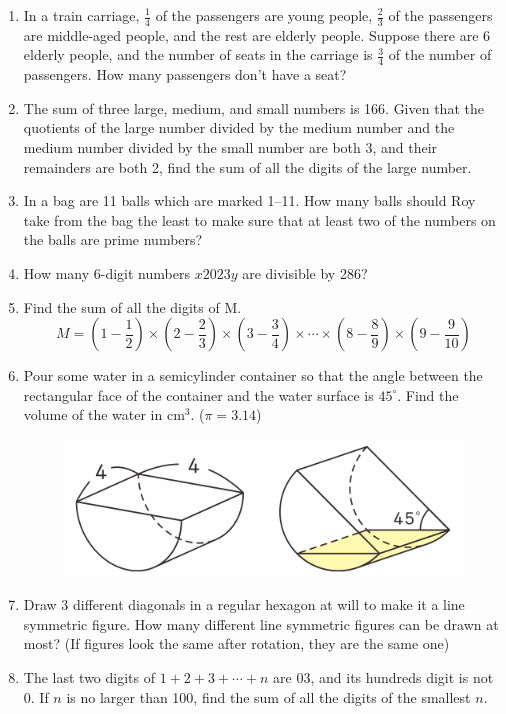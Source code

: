 \documentclass[11pt]{scrartcl}
\begin{document}
\begin{enumerate}
    \item In a train carriage, $\frac{1}{4}$ of the passengers are young people, $\frac{2}{3}$ of the passengers are middle-aged people, and the rest are elderly people. Suppose there are 6 elderly people, and the number of seats in the carriage is $\frac{3}{4}$ of the number of passengers. How many passengers don't have a seat?
    
    \item The sum of three large, medium, and small numbers is 166. Given that the quotients of the large number divided by the medium number and the medium number divided by the small number are both 3, and their remainders are both 2, find the sum of all the digits of the large number.

    
    \item In a bag are 11 balls which are marked 1--11. How many balls should Roy take from the bag the least to make sure that at least two of the numbers on the balls are prime numbers?
    
    \item How many 6-digit numbers $x2023y$ are divisible by 286?
    
    \item Find the sum of all the digits of M.
    \[M = (1 - \frac{1}{2}) \times (2 - \frac{2}{3}) \times (3 - \frac{3}{4}) \times \cdots \times (8 - \frac{8}{9}) \times (9 - \frac{9}{10})\]
    
    \item Pour some water in a semicylinder container so that the angle between the rectangular face of the container and the water surface is $45^\circ$. Find the volume of the water in cm$^3$. ($\pi = 3.14$)
    \begin{figure}[h]
        \centering
        \includegraphics[scale=0.5]{StarGen/0Figure/45-degree-cylinder-wmi-2023-g5.png}
    \end{figure}
    
    \item Draw 3 different diagonals in a regular hexagon at will to make it a line symmetric figure. How many different line symmetric figures can be drawn at most? (If figures look the same after rotation, they are the same one)
    
    \item The last two digits of $1 + 2 + 3 + \cdots + n$ are 03, and its hundreds digit is not 0. If $n$ is no larger than 100, find the sum of all the digits of the smallest $n$.
\end{enumerate}

\end{document}
